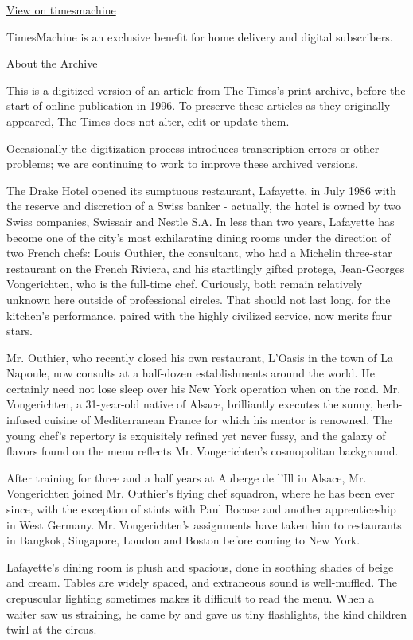 \href{http://timesmachine.nytimes.com/timesmachine/1988/04/22/067888.html}{View
on timesmachine}

TimesMachine is an exclusive benefit for home delivery and digital
subscribers.

About the Archive

This is a digitized version of an article from The Times's print
archive, before the start of online publication in 1996. To preserve
these articles as they originally appeared, The Times does not alter,
edit or update them.

Occasionally the digitization process introduces transcription errors or
other problems; we are continuing to work to improve these archived
versions.

The Drake Hotel opened its sumptuous restaurant, Lafayette, in July 1986
with the reserve and discretion of a Swiss banker - actually, the hotel
is owned by two Swiss companies, Swissair and Nestle S.A. In less than
two years, Lafayette has become one of the city's most exhilarating
dining rooms under the direction of two French chefs: Louis Outhier, the
consultant, who had a Michelin three-star restaurant on the French
Riviera, and his startlingly gifted protege, Jean-Georges Vongerichten,
who is the full-time chef. Curiously, both remain relatively unknown
here outside of professional circles. That should not last long, for the
kitchen's performance, paired with the highly civilized service, now
merits four stars.

Mr. Outhier, who recently closed his own restaurant, L'Oasis in the town
of La Napoule, now consults at a half-dozen establishments around the
world. He certainly need not lose sleep over his New York operation when
on the road. Mr. Vongerichten, a 31-year-old native of Alsace,
brilliantly executes the sunny, herb-infused cuisine of Mediterranean
France for which his mentor is renowned. The young chef's repertory is
exquisitely refined yet never fussy, and the galaxy of flavors found on
the menu reflects Mr. Vongerichten's cosmopolitan background.

After training for three and a half years at Auberge de l'Ill in Alsace,
Mr. Vongerichten joined Mr. Outhier's flying chef squadron, where he has
been ever since, with the exception of stints with Paul Bocuse and
another apprenticeship in West Germany. Mr. Vongerichten's assignments
have taken him to restaurants in Bangkok, Singapore, London and Boston
before coming to New York.

Lafayette's dining room is plush and spacious, done in soothing shades
of beige and cream. Tables are widely spaced, and extraneous sound is
well-muffled. The crepuscular lighting sometimes makes it difficult to
read the menu. When a waiter saw us straining, he came by and gave us
tiny flashlights, the kind children twirl at the circus.

